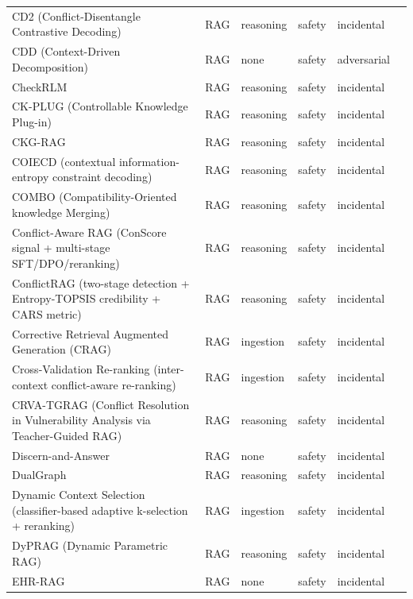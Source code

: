 \begin{longtable}{@{}p{}lllll@{}}
CD2 (Conflict-Disentangle Contrastive Decoding) & RAG & reasoning & safety & incidental & \cite{jin-2024-tugofwar} \\
CDD (Context-Driven Decomposition) & RAG & none & safety & adversarial & \cite{chen-2026-rag} \\
CheckRLM & RAG & reasoning & safety & incidental & \cite{xu-2026-checkrlm} \\
CK-PLUG (Controllable Knowledge Plug-in) & RAG & reasoning & safety & incidental & \cite{bi-2025-parameters} \\
CKG-RAG & RAG & reasoning & safety & incidental & \cite{zhang-2026-ckgrag} \\
COIECD (contextual information-entropy constraint decoding) & RAG & reasoning & safety & incidental & \cite{yuan-2024-discerning} \\
COMBO (Compatibility-Oriented knowledge Merging) & RAG & reasoning & safety & incidental & \cite{zhang-2023-merging} \\
Conflict-Aware RAG (ConScore signal + multi-stage SFT/DPO/reranking) & RAG & reasoning & safety & incidental & \cite{wu-2026-conflictaware} \\
ConflictRAG (two-stage detection + Entropy-TOPSIS credibility + CARS metric) & RAG & reasoning & safety & incidental & \cite{wang-2026-conflictrag} \\
Corrective Retrieval Augmented Generation (CRAG) & RAG & ingestion & safety & incidental & \cite{yan-2024-corrective} \\
Cross-Validation Re-ranking (inter-context conflict-aware re-ranking) & RAG & ingestion & safety & incidental & \cite{wu-2025-eliminating} \\
CRVA-TGRAG (Conflict Resolution in Vulnerability Analysis via Teacher-Guided RAG) & RAG & reasoning & safety & incidental & \cite{zhou-2026-tugofwar} \\
Discern-and-Answer & RAG & none & safety & incidental & \cite{hong-2023-gullible} \\
DualGraph & RAG & reasoning & safety & incidental & \cite{shi-2026-tale} \\
Dynamic Context Selection (classifier-based adaptive k-selection + reranking) & RAG & ingestion & safety & incidental & \cite{iratni-2025-dynamic} \\
DyPRAG (Dynamic Parametric RAG) & RAG & reasoning & safety & incidental & \cite{tan-2025-dynamic} \\
EHR-RAG & RAG & none & safety & incidental & \cite{cao-2026-ehrrag} \\

\end{longtable}

